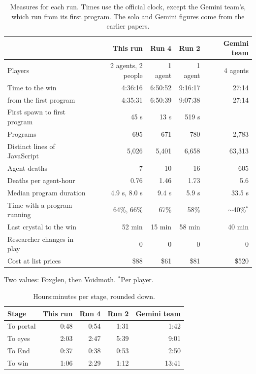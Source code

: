 \documentclass[11pt,a4paper]{article}
\begin{document}
\begin{table}[t]
  \caption{Measures for each run. Times use the official clock, except the Gemini team's, which run from its first program. The solo and Gemini figures come from the earlier papers.}
  \label{tab:headline}
  \small
  \begin{tabularx}{\textwidth}{@{}Xrrrr@{}}
    \toprule
    & \textbf{This run} & \textbf{Run 4} & \textbf{Run 2} & \textbf{Gemini team} \\
    \midrule
    Players & 2 agents, 2 people & 1 agent & 1 agent & 4 agents \\
    Time to the win & 4:36:16 & 6:50:52 & 9:16:17 & 27:14 \\
    \quad from the first program & 4:35:31 & 6:50:39 & 9:07:38 & 27:14 \\
    First spawn to first program & 45 s & 13 s & 519 s & \\
    Programs & 695 & 671 & 780 & 2,783 \\
    Distinct lines of JavaScript & 5,026 & 5,401 & 6,658 & 63,313 \\
    Agent deaths & 7 & 10 & 16 & 605 \\
    Deaths per agent-hour & 0.76 & 1.46 & 1.73 & 5.6 \\
    Median program duration & 4.9 s, 8.0 s & 9.4 s & 5.9 s & 33.5 s \\
    Time with a program running & 64\%, 66\% & 67\% & 58\% & ${\sim}$40\%$^{*}$ \\
    Last crystal to the win & 52 min & 15 min & 58 min & 40 min \\
    Researcher changes in play & 0 & 0 & 0 & 0 \\
    Cost at list prices & \$88 & \$61 & \$81 & \$520 \\
    \bottomrule
  \end{tabularx}\par\vspace{3pt}
  {\footnotesize Two values: Foxglen, then Voidmoth. $^{*}$Per player.}
\end{table}

\begin{table}[t]
  \caption{Hours:minutes per stage, rounded down.}
  \label{tab:stages}
  \small
  \begin{tabularx}{\textwidth}{@{}Xrrrr@{}}
    \toprule
    \textbf{Stage} & \textbf{This run} & \textbf{Run 4} & \textbf{Run 2} & \textbf{Gemini team} \\
    \midrule
    To portal & 0:48 & 0:54 & 1:31 & 1:42 \\
    To eyes & 2:03 & 2:47 & 5:39 & 9:01 \\
    To End & 0:37 & 0:38 & 0:53 & 2:50 \\
    To win & 1:06 & 2:29 & 1:12 & 13:41 \\
    \bottomrule
  \end{tabularx}
\end{table}
\end{document}
